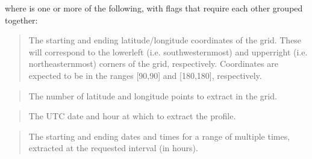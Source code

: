 \documentclass[letterpaper,10pt,english]{sphinxmanual}
\begin{document}
\sphinxAtStartPar
{}

\sphinxAtStartPar
where \sphinxcode{\sphinxupquote{{[}flags{]}}} is one or more of the following, with flags that require each other grouped together:

\sphinxAtStartPar
{}

\sphinxAtStartPar
{}
\begin{quote}

\sphinxAtStartPar
The starting and ending latitude/longitude coordinates of the grid.  These will correspond to the lower\sphinxhyphen{}left (i.e. southwesternmost) and upper\sphinxhyphen{}right (i.e. northeasternmost) corners of the grid, respectively.  Coordinates are expected to be in the ranges {[}\sphinxhyphen{}90,90{]} and {[}\sphinxhyphen{}180,180{]}, respectively.
\end{quote}

\sphinxAtStartPar
{}
\begin{quote}

\sphinxAtStartPar
The number of latitude and longitude points to extract in the grid.
\end{quote}

\sphinxAtStartPar
{}

\sphinxAtStartPar
{}
\begin{quote}

\sphinxAtStartPar
The UTC date and hour  at which to extract the profile.
\end{quote}

\sphinxAtStartPar
{}

\sphinxAtStartPar
{}
\begin{quote}

\sphinxAtStartPar
The starting and ending dates and times for a range of multiple times, extracted at the requested interval (in hours).
\end{quote}
\end{document}
